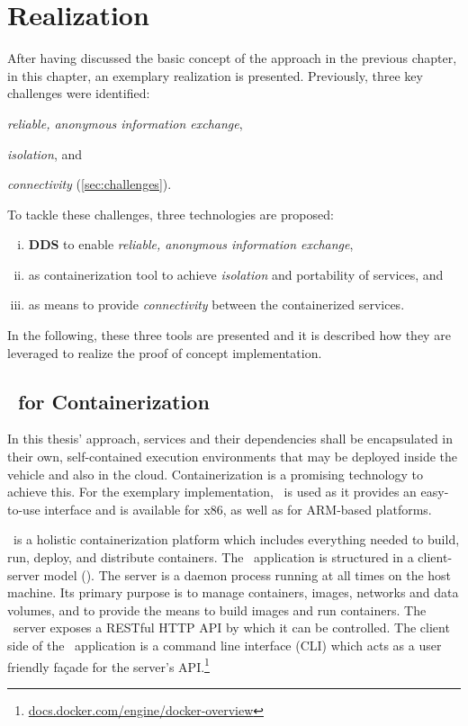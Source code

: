 \chapter{Realization} \label{chapter:realization}
After having discussed the basic concept of the approach in the previous chapter, in this chapter, an exemplary realization is presented. Previously, three key challenges were identified:
\begin{inparaenum}[(i)]
  \item \emph{reliable, anonymous information exchange},
  \item \emph{isolation}, and
  \item \emph{connectivity} (\cf \ref{sec:challenges}).
\end{inparaenum}
To tackle these challenges, three technologies are proposed:

\begin{enumerate}[(i)]
\item \textbf{DDS} to enable \emph{reliable, anonymous information exchange},
\item \textbf{\docker} as containerization tool to achieve \emph{isolation} and portability of services, and
\item \textbf{\wnet} as means to provide \emph{connectivity} between the containerized services.
\end{enumerate}

In the following, these three tools are presented and it is described how they are leveraged to realize the proof of concept implementation.




%
%
%
%
%
%
%
%
%
%
\pagebreak
\section{\docker\ for Containerization}
In this thesis' approach, services and their dependencies shall be encapsulated in their own, self-contained execution environments that may be deployed inside the vehicle and also in the cloud. Containerization is a promising technology to achieve this. For the exemplary implementation, \docker\ is used as it provides an easy-to-use interface and is available for x86, as well as for ARM-based platforms.

\docker\ is a holistic containerization platform which includes everything needed to build, run, deploy, and distribute containers. The \docker\ application is structured in a client-server model (\cf {}). The server is a daemon process running at all times on the host machine. Its primary purpose is to manage containers, images, networks and data volumes, and to provide the means to  build images and run containers. The \docker\ server exposes a RESTful HTTP API by which it can be controlled. The client side of the \docker\ application is a command line interface (CLI) which acts as a user friendly façade for the server's API.\footnote{\url{docs.docker.com/engine/docker-overview}}

